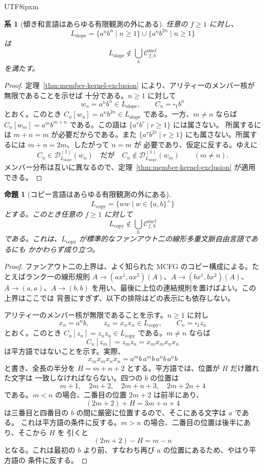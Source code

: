 \documentclass[10pt,a4paper]{article}
\newtheorem{proposition}[theorem]{命題}
\newtheorem{corollary}[theorem]{系}
\theoremstyle{remark}
\newcommand{\Cmcf}[2]{\mathcal{C}^{\mathrm{mcf}}_{#1,#2}}
\newcommand{\D}{\mathcal{D}}
\newcommand{\blank}{\square}
\begin{document}
\begin{CJK}{UTF8}{ipxm}
\begin{corollary}[傾き和言語はあらゆる有限観測の外にある]
\label{cor:slope-union-outside-every-finite-observation}
任意の \(f\ge1\) に対し、
\[
  L_{\mathrm{slope}}
  =
  \{a^n b^n\mid n\ge1\}
  \cup
  \{a^n b^{2n}\mid n\ge1\}
\]
は
\[
  L_{\mathrm{slope}}\notin \bigcup_h \Cmcf{f}{h}
\]
を満たす。
\end{corollary}

\begin{proof}
定理~\ref{thm:member-kernel-exclusion} により、アリティ一のメンバー核が無限であることを示せば
十分である。\(n\ge1\) に対して
\[
  w_n=a^n b^n\in L_{\mathrm{slope}},
  \qquad
  C_n=\blank_1 b^n
\]
とおく。このとき \(C_n[w_n]=a^n b^{2n}\in L_{\mathrm{slope}}\) である。一方、\(m\ne n\) ならば
\(C_n[w_m]=a^m b^{m+n}\) である。この語は \(\{a^r b^r\mid r\ge1\}\) には属さない。
所属するには \(m+n=m\) が必要だからである。また
\(\{a^r b^{2r}\mid r\ge1\}\) にも属さない。所属するには \(m+n=2m\)、したがって \(n=m\) が
必要であり、仮定に反する。ゆえに
\[
  C_n\in\D_{L_{\mathrm{slope}}}^{(1)}(w_n)
  \quad\text{だが}\quad
  C_n\notin\D_{L_{\mathrm{slope}}}^{(1)}(w_m)
  \qquad(m\ne n).
\]
メンバー分布は互いに異なるので、定理~\ref{thm:member-kernel-exclusion} が適用できる。
\end{proof}

\begin{proposition}[コピー言語はあらゆる有限観測の外にある]
\label{prop:copy-language-outside-every-finite-observation}
\[
  L_{\mathrm{copy}}=
  \{ww\mid w\in\{a,b\}^+\}
\]
とする。このとき任意の \(f\ge1\) に対して
\[
  L_{\mathrm{copy}}\notin\bigcup_h \Cmcf{f}{h}
\]
である。これは、\(L_{\mathrm{copy}}\) が標準的なファンアウト二の線形多重文脈自由言語であるにも
かかわらず成り立つ。
\end{proposition}

\begin{proof}
ファンアウト二の上界は、よく知られた MCFG のコピー構成による。たとえばランク一の線形規則
\(A\to(a x^1,a x^2)(A)\)、\(A\to(b x^1,b x^2)(A)\)、
\(A\to(a,a)\)、\(A\to(b,b)\) を用い、最後に上位の連結規則を置けばよい。この上界はここでは
背景にすぎず、以下の排除はどの表示にも依存しない。

アリティ一のメンバー核が無限であることを示す。\(n\ge1\) に対し
\[
  x_n=a^n b,
  \qquad
  z_n=x_nx_n\in L_{\mathrm{copy}},
  \qquad
  C_n=\blank_1 z_n
\]
とおく。このとき \(C_n[z_n]=z_nz_n\in L_{\mathrm{copy}}\) である。\(m\ne n\) ならば
\[
  C_n[z_m]=z_mz_n=x_mx_mx_nx_n
\]
は平方語ではないことを示す。実際、
\[
  x_mx_mx_nx_n=a^m b\,a^m b\,a^n b\,a^n b
\]
と書き、全長の半分を \(H=m+n+2\) とする。平方語では、位置が \(H\) だけ離れた文字は
一致しなければならない。四つの \(b\) の位置は
\[
  m+1,
  \quad 2m+2,
  \quad 2m+n+3,
  \quad 2m+2n+4
\]
である。\(m<n\) の場合、二番目の位置 \(2m+2\) は前半にあり、
\[
  (2m+2)+H=3m+n+4
\]
は三番目と四番目の \(b\) の間に厳密に位置するので、そこにある文字は \(a\) である。
これは平方語の条件に反する。\(m>n\) の場合、二番目の位置は後半にあり、そこから \(H\) を
引くと
\[
  (2m+2)-H=m-n
\]
となる。これは最初の \(b\) より前、すなわち再び \(a\) の位置にあるため、やはり平方語の
条件に反する。


\end{proof}
\end{CJK}
\end{document}
